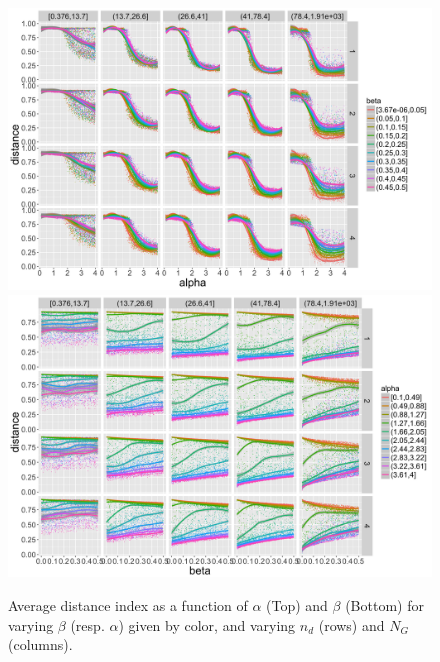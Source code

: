 \begin{figure}
\centering
\includegraphics[width=\textwidth]{figuresraw/distance_alpha}
\includegraphics[width=\textwidth]{figuresraw/distance_beta}
\caption{Average distance index as a function of $\alpha$ (Top) and $\beta$ (Bottom) for varying $\beta$ (resp. $\alpha$) given by color, and varying $n_d$ (rows) and $N_G$ (columns).}
\label{}
\end{figure}

